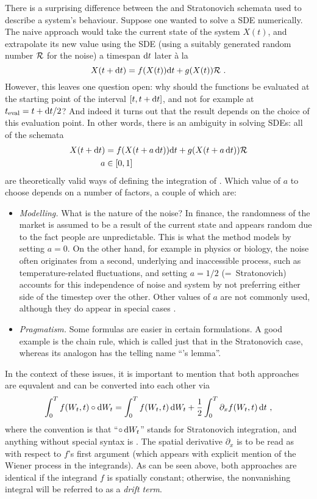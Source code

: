 There is a surprising difference between the \Ito{} and Stratonovich schemata used to describe a system's behaviour. Suppose one wanted to solve a SDE numerically. The naive approach would take the current state of the system \(X(t)\), and extrapolate its new value using the SDE (using a suitably generated random number \(\mathcal{R}\) for the noise) a timespan \(\mathrm{d} t\) later \`a la
%
\begin{equation}
	X(t+\mathrm{d} t) = f(X(t))\mathrm{d} t + g(X(t)) \mathcal{R} ~.
\end{equation}
%
However, this leaves one question open: why should the functions be evaluated at the starting point of the interval \([t,t+\mathrm{d} t]\), and not for example at \(t_\text{eval} = t+\mathrm{d} t/2\)? And indeed it turns out that the result depends on the choice of this evaluation point. In other words, there is an ambiguity in solving SDEs: all of the schemata
%
\begin{align}
	X(t+\mathrm{d} t) &= f(X(t+a\,\mathrm{d} t))\mathrm{d} t + g(X(t+a\,\mathrm{d} t)) \mathcal{R} \\
	a &\in [0,1]
\end{align}
%
are theoretically valid ways of defining the integration of . Which value of \(a\) to choose depends on a number of factors, a couple of which are:
%
\begin{itemize}
	\item \emph{Modelling.} What is the nature of the noise? In finance, the randomness of the market is assumed to be a result of the current state and appears random due to the fact people are unpredictable. This is what the \Ito{} method models by setting \(a = 0\). On the other hand, for example in physics or biology, the noise often originates from a second, underlying and inaccessible process, such as temperature-related fluctuations, and setting \(a = 1/2\) (=~Stratonovich) accounts for this independence of noise and system by not preferring either side of the timestep over the other. Other values of \(a\) are not commonly used, although they do appear in special cases .
	\item \emph{Pragmatism.} Some formulas are easier in certain formulations. A good example is the chain rule, which is called just that in the Stratonovich case, whereas its analogon has the telling name ``\Ito{}'s lemma''.
\end{itemize}
%
In the context of these issues, it is important to mention that both approaches are equvalent and can be converted into each other via
%
\begin{equation}
	\int_0^Tf(W_t,t)\circ\mathrm{d} W_t
	=
	\int_0^Tf(W_t,t)\,\mathrm{d} W_t
	+
	\frac12\int_0^T \partial_xf(W_t,t)\,\mathrm{d} t ~,
\end{equation}
%
where the convention is that ``\(\circ\,\mathrm{d} W_t\)'' stands for Stratonovich integration, and anything without special syntax is \Ito{}. The spatial derivative \(\partial_x\) is to be read as with respect to \(f\)'s first argument (which appears with explicit mention of the Wiener process in the integrands). As can be seen above, both approaches are identical if the integrand \(f\) is spatially constant; otherwise, the nonvanishing integral will be referred to as a \emph{drift term}.


